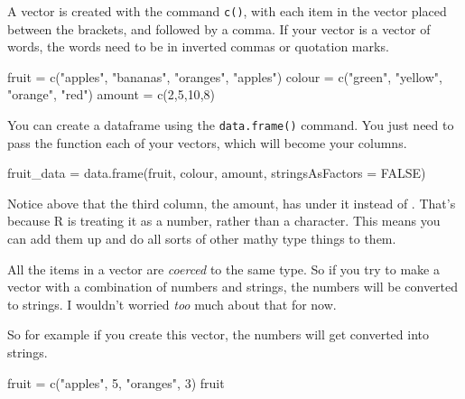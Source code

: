 \documentclass[
]{book}
\newenvironment{Shaded}{\begin{snugshade}}{\end{snugshade}}
\newcommand{\AttributeTok}[1]{\textcolor[rgb]{0.77,0.63,0.00}{#1}}
\newcommand{\ConstantTok}[1]{\textcolor[rgb]{0.00,0.00,0.00}{#1}}
\newcommand{\DecValTok}[1]{\textcolor[rgb]{0.00,0.00,0.81}{#1}}
\newcommand{\FunctionTok}[1]{\textcolor[rgb]{0.00,0.00,0.00}{#1}}
\newcommand{\NormalTok}[1]{#1}
\newcommand{\OtherTok}[1]{\textcolor[rgb]{0.56,0.35,0.01}{#1}}
\newcommand{\StringTok}[1]{\textcolor[rgb]{0.31,0.60,0.02}{#1}}
\begin{document}
A vector is created with the command \texttt{c()}, with each item in the vector placed between the brackets, and followed by a comma. If your vector is a vector of words, the words need to be in inverted commas or quotation marks.

\begin{Shaded}
\begin{Highlighting}[]
\NormalTok{fruit }\OtherTok{=} \FunctionTok{c}\NormalTok{(}\StringTok{"apples"}\NormalTok{, }\StringTok{"bananas"}\NormalTok{, }\StringTok{"oranges"}\NormalTok{, }\StringTok{"apples"}\NormalTok{)}
\NormalTok{colour }\OtherTok{=} \FunctionTok{c}\NormalTok{(}\StringTok{"green"}\NormalTok{, }\StringTok{"yellow"}\NormalTok{, }\StringTok{"orange"}\NormalTok{, }\StringTok{"red"}\NormalTok{)}
\NormalTok{amount }\OtherTok{=} \FunctionTok{c}\NormalTok{(}\DecValTok{2}\NormalTok{,}\DecValTok{5}\NormalTok{,}\DecValTok{10}\NormalTok{,}\DecValTok{8}\NormalTok{)}
\end{Highlighting}
\end{Shaded}

You can create a dataframe using the \texttt{data.frame()} command. You just need to pass the function each of your vectors, which will become your columns.

\begin{Shaded}
\begin{Highlighting}[]
\NormalTok{fruit\_data }\OtherTok{=} \FunctionTok{data.frame}\NormalTok{(fruit, colour, amount, }\AttributeTok{stringsAsFactors =} \ConstantTok{FALSE}\NormalTok{)}
\end{Highlighting}
\end{Shaded}

Notice above that the third column, the amount, has under it instead of . That's because R is treating it as a number, rather than a character. This means you can add them up and do all sorts of other mathy type things to them.

All the items in a vector are \emph{coerced} to the same type. So if you try to make a vector with a combination of numbers and strings, the numbers will be converted to strings. I wouldn't worried \emph{too} much about that for now.

So for example if you create this vector, the numbers will get converted into strings.

\begin{Shaded}
\begin{Highlighting}[]
\NormalTok{fruit }\OtherTok{=} \FunctionTok{c}\NormalTok{(}\StringTok{"apples"}\NormalTok{, }\DecValTok{5}\NormalTok{, }\StringTok{"oranges"}\NormalTok{, }\DecValTok{3}\NormalTok{)}
\NormalTok{fruit}
\end{Highlighting}
\end{Shaded}
\end{document}
